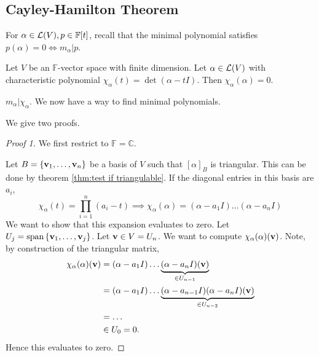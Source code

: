 \documentclass[a4paper]{article}
\begin{document}
\subsection{Cayley-Hamilton Theorem}
For $ \alpha\in {\mathcal{L}}(V), p\in \mathbb{F}[t] $, recall that the minimal polynomial satisfies $ p(\alpha) = 0 \iff m_\alpha | p $. 

\begin{theorem}
	Let $V$ be an $\mathbb{F}$-vector space with finite dimension. Let $\alpha\in {\mathcal{L}}(V)$ with characteristic polynomial $ \chi_\alpha(t) = \det (\alpha - t I). $
	Then $ \chi_\alpha(\alpha) = 0 $. 
\end{theorem}
\begin{corollary}
	$ m_\alpha | \chi_\alpha $. We now have a way to find minimal polynomials.
\end{corollary}
We give two proofs. 
\begin{proof}[Proof 1]
	We first restrict to $ \mathbb{F} = \mathbb{C} $. 
	
	Let $ B = \qty{{\bf v}_1, \dots, {\bf v}_n} $ be a basis of $ V $ such that $ [\alpha]_B $ is triangular. This can be done by theorem \ref{thm:test if triangulable}. If the diagonal entries in this basis are $ a_i $,
	\[
		\chi_\alpha(t) = \prod_{i=1}^n (a_i - t) \implies \chi_\alpha(\alpha) = (\alpha - a_1 I) \dots (\alpha - a_n I)
	\]
	We want to show that this expansion evaluates to zero.
	Let $ U_j = \operatorname{span} \qty{{\bf v}_1, \dots, {\bf v}_j} $.
	Let $ {\bf v} \in V = U_n $.
	We want to compute $ \chi_\alpha(\alpha)({\bf v}) $.
	Note, by construction of the triangular matrix,
	\begin{align*}
		\chi_\alpha(\alpha)({\bf v}) & = (\alpha - a_1 I) \dots \underbrace{(\alpha - a_n I)({\bf v})}_{\in U_{n-1}}                     \\
		                       & = (\alpha - a_1 I) \dots \underbrace{(\alpha - a_{n-1} I)(\alpha - a_n I)({\bf v})}_{\in U_{n-2}} \\
		                       & = \dots                                                                                     \\
		                       & \in U_0 = 0. 
	\end{align*}
	Hence this evaluates to zero.
\end{proof}
\end{document}
